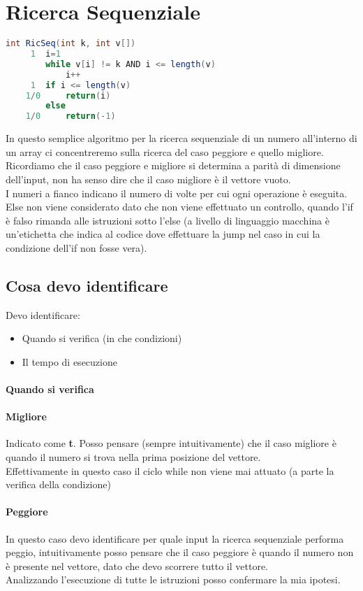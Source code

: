 \section{Ricerca Sequenziale}
\begin{lstlisting}[language=Java]
    int RicSeq(int k, int v[])
     1  i=1
        while v[i] != k AND i <= length(v)
            i++
     1  if i <= length(v)
    1/0     return(i)
        else
    1/0     return(-1)
\end{lstlisting}
In questo semplice algoritmo per la ricerca sequenziale di un numero all'interno
di un array ci concentreremo sulla ricerca del caso peggiore e quello migliore.\\
Ricordiamo che il caso peggiore e migliore si determina a parità di dimensione dell'input,
non ha senso dire che il caso migliore è il vettore vuoto.\\
I numeri a fianco indicano il numero di volte per cui ogni operazione è eseguita.
Else non viene considerato dato che non viene effettuato un controllo, quando l'if è falso rimanda
alle istruzioni sotto l'else (a livello di linguaggio macchina è un'etichetta che indica al codice
dove effettuare la jump nel caso in cui la condizione dell'if non fosse vera).
\subsection{Cosa devo identificare}
Devo identificare:
\begin{itemize}
    \item Quando si verifica (in che condizioni)
    \item Il tempo di esecuzione
\end{itemize}
\paragraph*{Quando si verifica}
\paragraph*{Migliore} Indicato come \textbf{t}. Posso pensare (sempre intuitivamente) che il caso migliore è quando il numero
si trova nella prima posizione del vettore.\\
Effettivamente in questo caso il ciclo while non viene mai attuato (a parte la verifica della condizione)
\paragraph*{Peggiore} In questo caso devo identificare per quale input la ricerca sequenziale
performa peggio, intuitivamente posso pensare che il caso peggiore è quando il numero non è presente
nel vettore, dato che devo scorrere tutto il vettore.\\
Analizzando l'esecuzione di tutte le istruzioni posso confermare la mia ipotesi.\\

